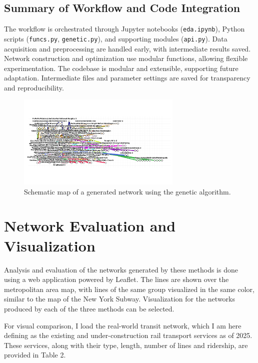 \documentclass[manuscript]{acmart}
\begin{document}
\subsection{Summary of Workflow and Code Integration}
The workflow is orchestrated through Jupyter notebooks (\texttt{eda.ipynb}), Python scripts (\texttt{funcs.py}, \texttt{genetic.py}), and supporting modules (\texttt{api.py}). Data acquisition and preprocessing are handled early, with intermediate results saved. Network construction and optimization use modular functions, allowing flexible experimentation. The codebase is modular and extensible, supporting future adaptation. Intermediate files and parameter settings are saved for transparency and reproducibility.

\begin{figure}[h]
    \centering
    \includegraphics[width=0.7\textwidth]{img/lines_genetic.png}
    \caption{Schematic map of a generated network using the genetic algorithm.}
    \label{fig:schematic2}
\end{figure}

\section{Network Evaluation and Visualization}

Analysis and evaluation of the networks generated by these methods is done using a web application powered by Leaflet. The lines are shown over the metropolitan area map, with lines of the same group visualized in the same color, similar to the map of the New York Subway. Visualization for the networks produced by each of the three methods can be selected.

For visual comparison, I load the real-world transit network, which I am here defining as the existing and under-construction rail transport services as of 2025. These services, along with their type, length, number of lines and ridership, are provided in Table 2. 
\end{document}
